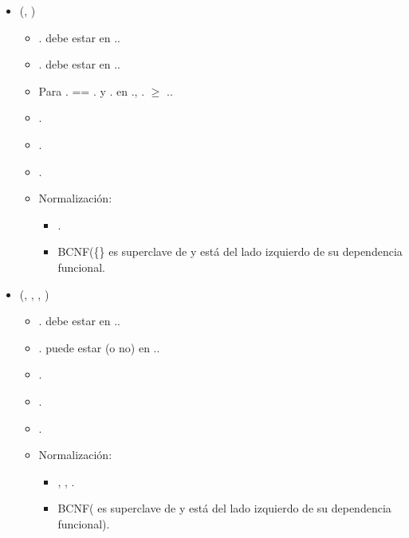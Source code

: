 \begin{itemize}
        \item {}(, )
            \begin{itemize}
                \item {}. debe estar en 
                    ..
                \item {}. debe estar en 
                    ..
                \item Para . == 
                    . y . en 
                    .,
                    . $\geq$ 
                    ..
                \item {}.
                \item {}.
                \item {}.
                \item Normalización:
                    \begin{itemize}
                        \item {}.
                        \item BCNF(\{\} es superclave de 
                             y está del lado izquierdo
                            de su dependencia funcional.
                    \end{itemize}
            \end{itemize}


        \item {}(, , 
            , )
            \begin{itemize}
                \item {}. debe estar en 
                    ..
                \item {}. puede estar (o no) en 
                    ..
                \item {}.
                \item {}.
                \item {}.
                \item Normalización:
                    \begin{itemize}
                        \item {}
                            {, , }.
                        \item BCNF( es
                            superclave de  y está del lado izquierdo
                            de su dependencia funcional).
                    \end{itemize}
            \end{itemize}



\end{itemize}
